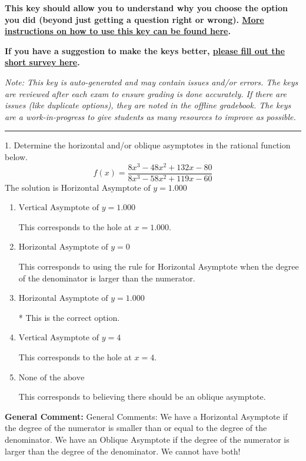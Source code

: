 \documentclass{extbook}[14pt]
\begin{document}
\textbf{This key should allow you to understand why you choose the option you did (beyond just getting a question right or wrong). \href{https://xronos.clas.ufl.edu/mac1105spring2020/courseDescriptionAndMisc/Exams/LearningFromResults}{More instructions on how to use this key can be found here}.}

\textbf{If you have a suggestion to make the keys better, \href{https://forms.gle/CZkbZmPbC9XALEE88}{please fill out the short survey here}.}

\textit{Note: This key is auto-generated and may contain issues and/or errors. The keys are reviewed after each exam to ensure grading is done accurately. If there are issues (like duplicate options), they are noted in the offline gradebook. The keys are a work-in-progress to give students as many resources to improve as possible.}

\rule{\textwidth}{0.4pt}

1. Determine the horizontal and/or oblique asymptotes in the rational function below.
\[ f(x) = \frac{8x^{3} -48 x^{2} +132 x -80}{8x^{3} -58 x^{2} +119 x -60} \] 
The solution is $ \text{Horizontal Asymptote of } y = 1.000  $ 

\begin{enumerate}[label=\Alph*.] 
\item $ \text{Vertical Asymptote of } y = 1.000  $ 

 This corresponds to the hole at $x = 1.000$. 
\item $ \text{Horizontal Asymptote of } y = 0  $ 

 This corresponds to using the rule for Horizontal Asymptote when the degree of the denominator is larger than the numerator. 
\item $ \text{Horizontal Asymptote of } y = 1.000  $ 

 * This is the correct option. 
\item $ \text{Vertical Asymptote of } y = 4  $ 

 This corresponds to the hole at $x = 4$. 
\item $ \text{None of the above} $ 

 This corresponds to believing there should be an oblique asymptote. 
\end{enumerate} 
 
\textbf{General Comment:} General Comments: We have a Horizontal Asymptote if the degree of the numerator is smaller than or equal to the degree of the denominator. We have an Oblique Asymptote if the degree of the numerator is larger than the degree of the denominator. We cannot have both! 
\end{document}
